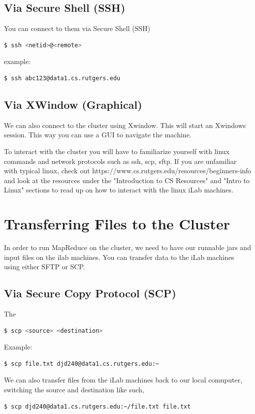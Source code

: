 \documentclass{article}
\begin{document}
\subsection{Via Secure Shell (SSH)}
You can connect to them via Secure Shell (SSH)
\begin{lstlisting}[language=bash]
  $ ssh <netid>@<remote>
\end{lstlisting}
example:
\begin{lstlisting}[language=bash]
  $ ssh abc123@data1.cs.rutgers.edu
\end{lstlisting}

\subsection{Via XWindow (Graphical)}
We can also connect to the cluster using Xwindow. This will start an Xwindows session. This way you can use a GUI to navigate the machine.

\begin{info}
To interact with the cluster you will have to familiarize yourself with linux commands and network protocols such as ssh, scp, sftp. If you are unfamiliar with typical linux, check out https://www.cs.rutgers.edu/resources/beginners-info and look at the resources under the "Introduction to CS Resources" and "Intro to Linux" sections to read up on how to interact with the linux iLab machines.
\end{info}



\section{Transferring Files to the Cluster}
In order to run MapReduce on the cluster, we need to have our runnable jars and input files on the ilab machines. You can transfer data to the iLab machines using either SFTP or SCP. 
\subsection{Via Secure Copy Protocol (SCP)}
The 
\begin{lstlisting}[language=bash]
  $ scp <source> <destination>
\end{lstlisting}
Example:
\begin{lstlisting}[language=bash]
  $ scp file.txt djd240@data1.cs.rutgers.edu:~
\end{lstlisting}
We can also transfer files from the iLab machines back to our local comuputer, switching the source and destination like such,
\begin{lstlisting}[language=bash]
  $ scp djd240@data1.cs.rutgers.edu:~/file.txt file.txt
\end{lstlisting}
\end{document}
